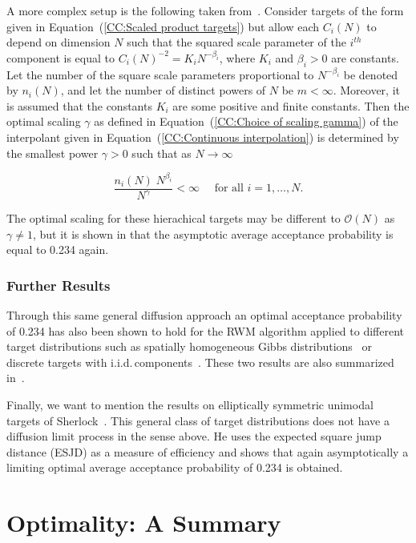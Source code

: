 A more complex setup is the following taken from~\autocite{Bedard2007}. Consider targets of the form given in Equation~(\ref{CC:Scaled product targets}) but allow each $C_i(N)$ to depend on dimension $N$ such that the squared scale parameter of the $i^{th}$ component is equal to $ C_i(N)^{-2} = K_i  N^{-\beta_i} $, where $K_i$ and $\beta_i>0$ are constants. Let the number of the square scale parameters proportional to $N^{-\beta_i}$ be denoted by $ n_i(N) $, and let the number of distinct powers of $N$ be $m<\infty$. Moreover, it is assumed that the constants $K_i$ are some positive and finite constants. Then the optimal scaling $\gamma$ as defined in Equation~(\ref{CC:Choice of scaling gamma}) of the interpolant given in Equation~(\ref{CC:Continuous interpolation}) is determined by the smallest power $ \gamma > 0 $ such that as $N \to \infty$ 

\begin{equation}
 \frac{n_i(N) \; N^{\beta_i}}{N^{\gamma}} < \infty \quad \text{ for all } i = 1, \dots, N.
\end{equation}

The optimal scaling for these hierachical targets may be different to $\mathcal{O}(N)$ as $ \gamma \neq 1 $, but it is shown in \autocite{Bedard2007} that the asymptotic average acceptance probability is equal to 0.234 again.

\subsubsection{Further Results}

Through this same general diffusion approach an optimal acceptance probability of 0.234 has also been shown to hold for the RWM algorithm applied to different target distributions such as spatially homogeneous Gibbs distributions~\autocite{Breyer2000} or discrete targets with i.i.d.\,components~\autocite{Roberts1998-2}.  These two results are also summarized in~\autocite{Roberts2001}.

Finally, we want to mention the results on elliptically symmetric unimodal targets of Sherlock~\autocite{Sherlock2006}. This general class of target distributions does not have a diffusion limit process in the sense above. He uses the expected square jump distance (ESJD) as a measure of efficiency and shows that again asymptotically a limiting optimal average acceptance probability of 0.234 is obtained.



\section{Optimality: A Summary}

